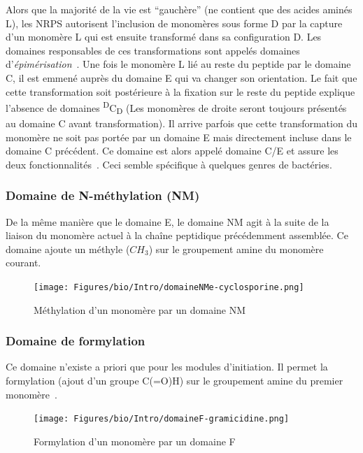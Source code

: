 Alors que la majorité de la vie est ``gauchère'' (ne contient que des acides aminés L), les NRPS autorisent l'inclusion de monomères sous forme D par la capture d'un monomère L qui est ensuite transformé dans sa configuration D.
Les domaines responsables de ces transformations sont appelés domaines d'\textit{épimérisation}~\cite{calcott_portability_2015}.
Une fois le monomère L lié au reste du peptide par le domaine C, il est emmené auprès du domaine E qui va changer son orientation.
Le fait que cette transformation soit postérieure à la fixation sur le reste du peptide explique l'absence de domaines \textsuperscript{D}C\textsubscript{D} (Les monomères de droite seront toujours présentés au domaine C avant transformation).
Il arrive parfois que cette transformation du monomère ne soit pas portée par un domaine E mais directement incluse dans le domaine C précédent.
Ce domaine est alors appelé domaine C/E et assure les deux fonctionnalités~\cite{yin_enduracidin_2006,balibar_generation_2005}.
Ceci semble spécifique à quelques genres de bactéries.


\subsubsection{Domaine de N-méthylation (NM)}

De la même manière que le domaine E, le domaine NM agit à la suite de la liaison du monomère actuel à la chaîne peptidique précédemment assemblée.
Ce domaine ajoute un méthyle ($CH_{3}$) sur le groupement amine du monomère courant.

\begin{figure}[h!]
  \begin{center}
    \texttt{[image: Figures/bio/Intro/domaineNMe-cyclosporine.png]}
    \caption{\label{domaine_NMe}Méthylation d'un monomère par un domaine NM}
  \end{center}
\end{figure}

\subsubsection{Domaine de formylation}

Ce domaine n'existe a priori que pour les modules d'initiation.
Il permet la formylation (ajout d'un groupe C(=O)H) sur le groupement amine du premier monomère~\cite{schonafinger_amide_2007}.

\begin{figure}[h!]
  \begin{center}
    \texttt{[image: Figures/bio/Intro/domaineF-gramicidine.png]}
    \caption{\label{domaine_F}Formylation d'un monomère par un domaine F}
  \end{center}
\end{figure}


